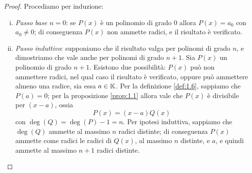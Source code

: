 \begin{proof}
    Procediamo per induzione:
    \begin{enumerate}[(i)]
        \item \emph{Passo base $n=0$}: se $P(x)$ è un polinomio di grado $0$ allora $P(x) = a_0$ con $a_0\ne 0$; di conseguenza $P(x)$ non ammette radici, e il risultato è verificato.
        \item \emph{Passo induttivo}: supponiamo che il risultato valga per polinomi di grado $n$, e dimostriamo che vale anche per polinomi di grado $n+1$. Sia $P(x)$ un polinomio di grado $n+1$. Esistono due possibilità: $P(x)$ può non ammettere radici, nel qual caso il risultato è verificato, oppure può ammettere almeno una radice, sia essa $a\in\amsbb{K}$. Per la definizione \ref{def:1.6}, sappiamo che $P(a) = 0$; per la proposizione \ref{prop:1.1} allora vale che $P(x)$ è divisibile per $(x-a)$, ossia
        \[
        P(x)=(x-a)Q(x)
        \]
        con $\deg(Q) = \deg(P)-1 = n$. Per ipotesi induttiva, sappiamo che $\deg(Q)$ ammette al massimo $n$ radici distinte; di conseguenza $P(x)$ ammette come radici le radici di $Q(x)$, al massimo $n$ distinte, e $a$, e quindi ammette al massimo $n+1$ radici distinte. \qedhere
    \end{enumerate}
\end{proof}
